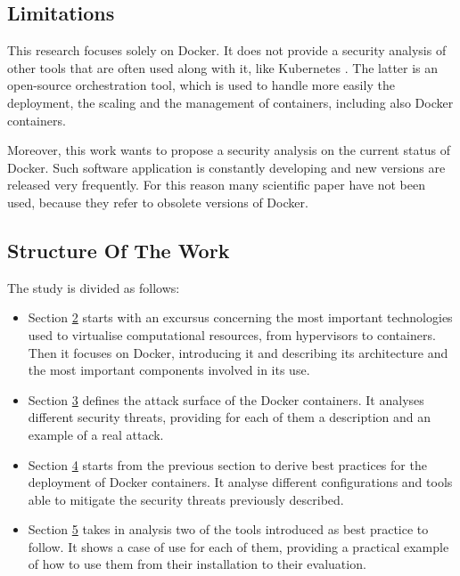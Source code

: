 \documentclass[a4paper,12pt]{article}
\begin{document}
\subsection{Limitations}

This research focuses solely on Docker. It does not provide a security analysis
of other tools that are often used along with it, like Kubernetes
\cite{kubernetes}. The latter is an open-source orchestration tool, which is
used to handle more easily the deployment, the scaling and the management of
containers, including also Docker containers. \par Moreover, this work wants to
propose a security analysis on the current status of Docker. Such software
application is constantly developing and new versions are released very
frequently. For this reason many scientific paper have not been used, because
they refer to obsolete versions of Docker.

\subsection{Structure Of The Work}

The study is divided as follows:
\begin{itemize}
  \item Section \hyperref[sec:docker_overview]{2} starts with an excursus
  concerning the most important technologies used to virtualise computational
  resources, from hypervisors to containers. Then it focuses on Docker,
  introducing it and describing its architecture and the most important
  components involved in its use. 
  \item Section \hyperref[sec:docker_security_threats]{3} defines the
  attack surface of the Docker containers. It analyses different security
  threats, providing for each of them a description and an example of a real
  attack. 
  \item Section \hyperref[sec:best_practices_for_docker_deployment]{4} starts
  from the previous section to derive best practices for the deployment of
  Docker containers. It analyse different configurations and tools able to
  mitigate the security threats previously described.
  \item Section \hyperref[sec:practical_evaluation]{5} takes in analysis two of
  the tools introduced as best practice to follow. It shows a case of use for
  each of them, providing a practical example of how to use them from their
  installation to their evaluation.
\end{itemize}
\end{document}
